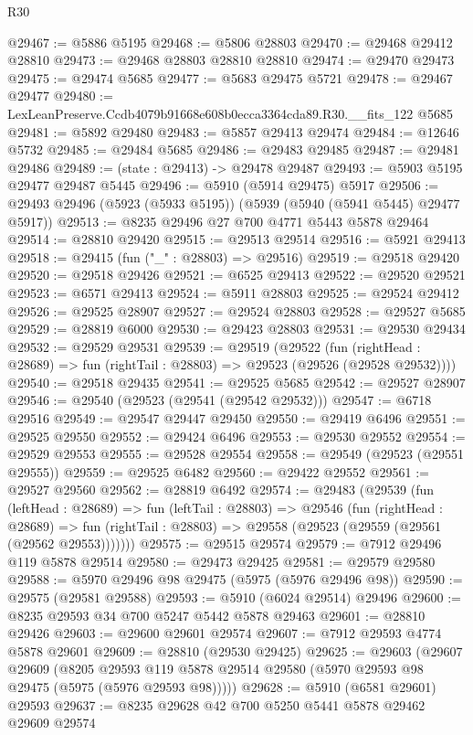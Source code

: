 \begin{lexlean}{R30}
\begin{coremodule}
@29467 := @5886 @5195
@29468 := @5806 @28803
@29470 := @29468 @29412 @28810
@29473 := @29468 @28803 @28810 @28810
@29474 := @29470 @29473
@29475 := @29474 @5685
@29477 := @5683 @29475 @5721
@29478 := @29467 @29477
@29480 := LexLeanPreserve.Ccdb4079b91668e608b0ecca3364cda89.R30.__fits_122 @5685
@29481 := @5892 @29480
@29483 := @5857 @29413 @29474
@29484 := @12646 @5732
@29485 := @29484 @5685
@29486 := @29483 @29485
@29487 := @29481 @29486
@29489 := (state : @29413) -> @29478 @29487
@29493 := @5903 @5195 @29477 @29487 @5445
@29496 := @5910 (@5914 @29475) @5917
@29506 := @29493 @29496 (@5923 (@5933 @5195)) (@5939 (@5940 (@5941 @5445) @29477 @5917))
@29513 := @8235 @29496 @27 @700 @4771 @5443 @5878 @29464
@29514 := @28810 @29420
@29515 := @29513 @29514
@29516 := @5921 @29413
@29518 := @29415 (fun ("_" : @28803) => @29516)
@29519 := @29518 @29420
@29520 := @29518 @29426
@29521 := @6525 @29413
@29522 := @29520 @29521
@29523 := @6571 @29413
@29524 := @5911 @28803
@29525 := @29524 @29412
@29526 := @29525 @28907
@29527 := @29524 @28803
@29528 := @29527 @5685
@29529 := @28819 @6000
@29530 := @29423 @28803
@29531 := @29530 @29434
@29532 := @29529 @29531
@29539 := @29519
    (@29522
      (fun (rightHead : @28689) => fun (rightTail : @28803) => @29523 (@29526 (@29528 @29532))))
@29540 := @29518 @29435
@29541 := @29525 @5685
@29542 := @29527 @28907
@29546 := @29540 (@29523 (@29541 (@29542 @29532)))
@29547 := @6718 @29516
@29549 := @29547 @29447 @29450
@29550 := @29419 @6496
@29551 := @29525 @29550
@29552 := @29424 @6496
@29553 := @29530 @29552
@29554 := @29529 @29553
@29555 := @29528 @29554
@29558 := @29549 (@29523 (@29551 @29555))
@29559 := @29525 @6482
@29560 := @29422 @29552
@29561 := @29527 @29560
@29562 := @28819 @6492
@29574 := @29483
    (@29539
      (fun (leftHead : @28689) =>
      fun (leftTail : @28803) =>
      @29546
        (fun (rightHead : @28689) =>
        fun (rightTail : @28803) => @29558 (@29523 (@29559 (@29561 (@29562 @29553)))))))
@29575 := @29515 @29574
@29579 := @7912 @29496 @119 @5878 @29514
@29580 := @29473 @29425
@29581 := @29579 @29580
@29588 := @5970 @29496 @98 @29475 (@5975 (@5976 @29496 @98))
@29590 := @29575 (@29581 @29588)
@29593 := @5910 (@6024 @29514) @29496
@29600 := @8235 @29593 @34 @700 @5247 @5442 @5878 @29463
@29601 := @28810 @29426
@29603 := @29600 @29601 @29574
@29607 := @7912 @29593 @4774 @5878 @29601
@29609 := @28810 (@29530 @29425)
@29625 := @29603
    (@29607
      @29609
      (@8205 @29593 @119 @5878 @29514 @29580 (@5970 @29593 @98 @29475 (@5975 (@5976 @29593 @98)))))
@29628 := @5910 (@6581 @29601) @29593
@29637 := @8235 @29628 @42 @700 @5250 @5441 @5878 @29462 @29609 @29574

\end{coremodule}
\end{lexlean}
